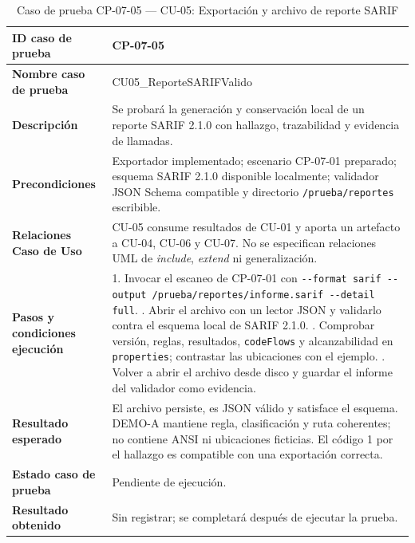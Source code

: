 \clearpage
\begin{table}[H]
\centering\small{}
\renewcommand{\arraystretch}{1.15}
\caption{Caso de prueba CP-07-05 --- CU-05: Exportación y archivo de reporte SARIF}
\label{p7:tab:cp07_05}
\begin{tabularx}{\textwidth}{|P{4.15cm}|Y|}
\hline
\textbf{ID caso de prueba} & CP-07-05 \\ \hline
\textbf{Nombre caso de prueba} & CU05\_\allowbreak ReporteSARIFValido \\ \hline
\textbf{Descripción} & Se probará la generación y conservación local de un reporte SARIF 2.1.0 con hallazgo, trazabilidad y evidencia de llamadas. \\ \hline
\textbf{Precondiciones} & Exportador implementado; escenario CP-07-01 preparado; esquema SARIF 2.1.0 disponible localmente; validador JSON Schema compatible y directorio \texttt{/\allowbreak prueba/\allowbreak reportes} escribible. \\ \hline
\textbf{Relaciones Caso de Uso} & CU-05 consume resultados de CU-01 y aporta un artefacto a CU-04, CU-06 y CU-07. No se especifican relaciones UML de \textit{include}, \textit{extend} ni generalización. \\ \hline
\textbf{Pasos y condiciones ejecución} & 1. Invocar el escaneo de CP-07-01 con \texttt{-\allowbreak -\allowbreak format sarif -\allowbreak -\allowbreak output /\allowbreak prueba/\allowbreak reportes/\allowbreak informe.\allowbreak sarif -\allowbreak -\allowbreak detail full}. . Abrir el archivo con un lector JSON y validarlo contra el esquema local de SARIF 2.1.0. . Comprobar versión, reglas, resultados, \texttt{codeFlows} y alcanzabilidad en \texttt{properties}; contrastar las ubicaciones con el ejemplo. . Volver a abrir el archivo desde disco y guardar el informe del validador como evidencia. \\ \hline
\textbf{Resultado esperado} & El archivo persiste, es JSON válido y satisface el esquema. DEMO-A mantiene regla, clasificación y ruta coherentes; no contiene ANSI ni ubicaciones ficticias. El código 1 por el hallazgo es compatible con una exportación correcta. \\ \hline
\textbf{Estado caso de prueba} & Pendiente de ejecución. \\ \hline
\textbf{Resultado obtenido} & Sin registrar; se completará después de ejecutar la prueba. \\ \hline

\end{tabularx}
\end{table}
